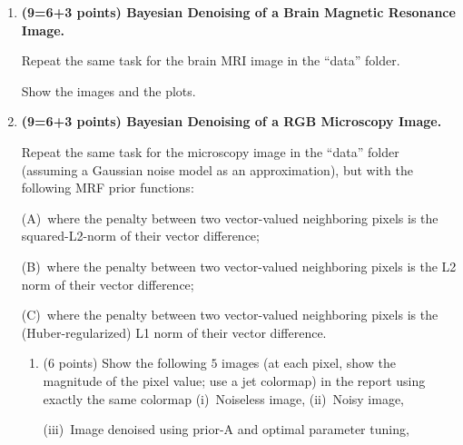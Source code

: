 \documentclass[12pt]{article}
\begin{document}
\begin {enumerate}
\begin {enumerate}
    (iii)~Image denoised using quadratic prior $g_1 (\cdot)$ and optimal parameter tuning;
    
    (iv)~Image denoised using Huber prior $g_1 (\cdot)$ and optimal parameter tuning;
    
    (v)~Image denoised using discontinuity-adaptive prior $g_3 (\cdot)$ and optimal parameter tuning.
    
  \item (3 points)
    
    Show the plots of the objective-function values (vertical axis) versus iteration (horizontal axis)
    corresponding to each of the 3 denoised results in (iii), (iv), and (v) above.
  \end {enumerate}
  
  \newpage
  
\item {\bf (9=6+3 points)  Bayesian Denoising of a Brain Magnetic Resonance Image.}
  
  Repeat the same task for the brain MRI image in the ``data'' folder.

  Show the images and the plots.
  
  \newpage
  
\item {\bf (9=6+3 points) Bayesian Denoising of a RGB Microscopy Image.}
  
  Repeat the same task for the microscopy image in the ``data'' folder (assuming a Gaussian noise model as an
  approximation), but with the following MRF prior functions:
  
  (A)~where the penalty between two vector-valued neighboring pixels is the squared-L2-norm of their vector
  difference;
  
  (B)~where the penalty between two vector-valued neighboring pixels is the L2 norm of their vector
  difference;
  
  (C)~where the penalty between two vector-valued neighboring pixels is the (Huber-regularized) L1 norm of
  their vector difference.
  
  \begin {enumerate}
    
  \item (6 points) Show the following $5$ images (at each pixel, show the magnitude of the pixel value; use a
    jet colormap) in the report using exactly the same colormap (i)~Noiseless image, (ii)~Noisy image,
    
    (iii)~Image denoised using prior-A and optimal parameter tuning,
    

\end{enumerate}
\end{enumerate}
\end{document}
